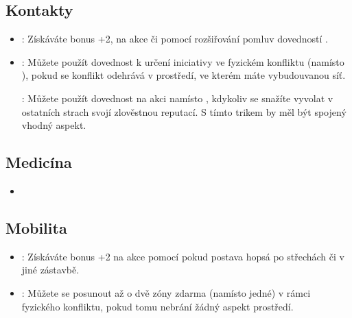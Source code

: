 \subsection{Kontakty}
\label{sec:trik-kontakty}

\begin{itemize}
\item{}:
\label{sec:kontakty-drbna}
Získáváte bonus +2, na akce  či  pomocí rozšiřování pomluv dovedností .

\item{}:
\label{sec:kontakty-ucho}
Můžete použít dovednost  k určení iniciativy ve fyzickém konfliktu (namísto ), pokud se konflikt odehrává v prostředí, ve kterém máte vybudouvanou síť.

:
\label{sec:kontakty-reputace}
Můžete použít dovednost  na akci  namísto , kdykoliv se snažíte vyvolat v ostatních strach svojí zlověstnou reputací. S tímto trikem by měl být spojený vhodný aspekt.
\end{itemize}

\subsection{Medicína}
\label{sec:trik-medicina}
\begin{itemize}
  \item
\end{itemize}

\subsection{Mobilita}
\label{sec:trik-mobilita}
\begin{itemize}
  
\item{}:
\label{sec:mobilita-parkour}
Získáváte bonus +2 na akce  pomocí  pokud postava hopsá po střechách či v jiné zástavbě.

\item{}:
\label{sec:mobilita-sprinter}
Můžete se posunout až o dvě zóny zdarma (namísto jedné) v rámci fyzického konfliktu, pokud tomu nebrání žádný aspekt prostředí.
\end{itemize}

